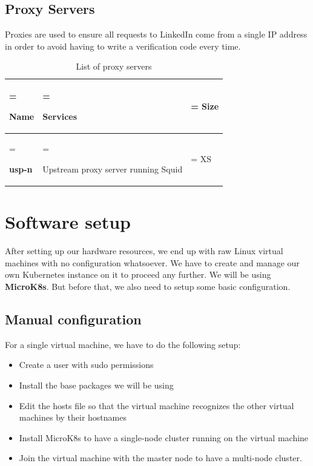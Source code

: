 \subsection{Proxy Servers}
Proxies are used to ensure all requests to LinkedIn come from a single IP address in order to avoid having to write a verification code every time.
\begin{table}[H]
    \renewcommand{\arraystretch}{1.5} %
    \caption{List of proxy servers}
    \centering
    \medskip
    \begin{tabularx}{1\textwidth} {
            | >{\hsize=1\hsize\linewidth=\hsize\raggedright\arraybackslash}X
            | >{\hsize=1.8\hsize\linewidth=\hsize\raggedright\arraybackslash}X
            | >{\hsize=0.2\hsize\linewidth=\hsize\centering\arraybackslash}X |}
        \hline
        \rowcolor{primary} \textbf{Name} & \textbf{Services}                   & \textbf{Size} \\
        \hline
        \textbf{usp-n}                   & Upstream proxy server running Squid & XS            \\
        \hline
    \end{tabularx}
\end{table}

\newpage
\section{Software setup}
After setting up our hardware resources, we end up with raw Linux virtual machines with no configuration whatsoever.
We have to create and manage our own Kubernetes instance on it to proceed any further.
We will be using {\bf MicroK8s}.
But before that, we also need to setup some basic configuration.

\subsection{Manual configuration}
For a single virtual machine, we have to do the following setup:

\begin{itemize}
    \item Create a user with sudo permissions
    \item Install the base packages we will be using
    \item Edit the hosts file so that the virtual machine recognizes the other virtual machines by their hostnames
    \item Install MicroK8s to have a single-node cluster running on the virtual machine
    \item Join the virtual machine with the master node to have a multi-node cluster.
\end{itemize}

